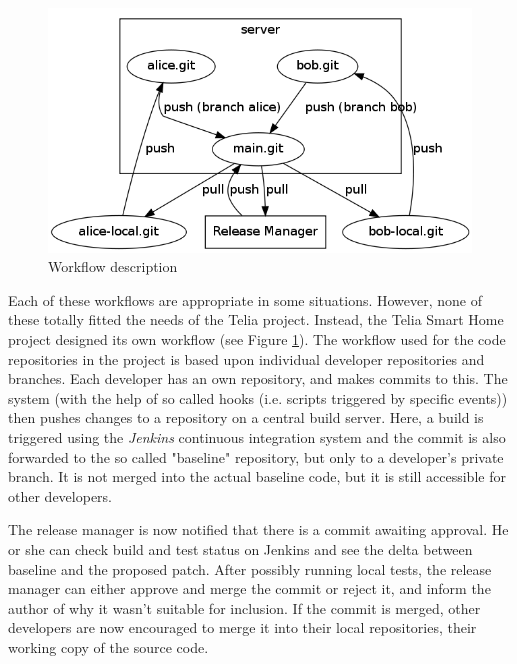 \documentclass{llncs}
\begin{document}
\begin{figure}
 \begin{center}
  \includegraphics[scale=0.5]{workflow.png}
  \caption{Workflow description}
  \label{fig:workflow}
 \end{center}
\end{figure}

Each of these workflows are appropriate in some situations. However,
none of these totally fitted the needs of the Telia project. Instead,
the Telia Smart Home project designed its own workflow (see Figure
\ref{fig:workflow}). The workflow used for the code repositories in the
project is based upon individual developer repositories and branches.
Each developer has an own repository, and makes commits to this. The
system (with the help of so called hooks (i.e. scripts triggered by
specific events)) then pushes changes to a repository on a central build
server. Here, a build is triggered using the \emph{Jenkins} continuous
integration system and the commit is also forwarded to the so called
"baseline" repository, but only to a developer's private branch. It is
not merged into the actual baseline code, but it is still accessible for
other developers.

The release manager is now notified that there is a commit awaiting
approval. He or she can check build and test status on Jenkins and see the
delta between baseline and the proposed patch. After possibly running local
tests, the release manager can either approve and merge the commit or
reject it, and inform the author of why it wasn't suitable for inclusion.
If the commit is merged, other developers are now encouraged to merge it 
into their local repositories, their working copy of the source code. 
\end{document}
